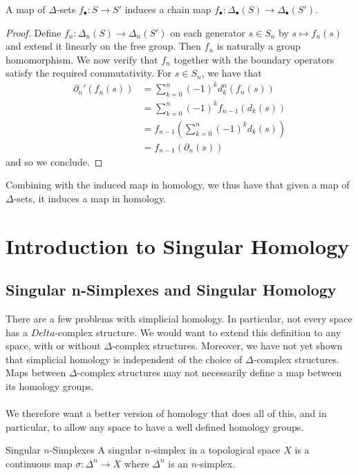 \documentclass[a4paper]{article}
\begin{document}
\begin{lmm}{}{} A map of $\Delta$-sets $f_\bullet:S\to S'$ induces a chain map $f_\bullet:\Delta_\bullet(S)\to\Delta_\bullet(S')$. \tcbline
\begin{proof}
Define $f_n:\Delta_n(S)\to\Delta_n(S')$ on each generator $s\in S_n$ by $s\mapsto f_n(s)$ and extend it linearly on the free group. Then $f_n$ is naturally a group homomorphism. We now verify that $f_n$ together with the boundary operators satisfy the required commutativity. For $s\in S_n$, we have that 
\begin{align*}
\partial_n'(f_n(s))&=\sum_{k=0}^n(-1)^kd_k^n(f_n(s))\\
&=\sum_{k=0}^n(-1)^kf_{n-1}(d_k(s))\\
&=f_{n-1}\left(\sum_{k=0}^n(-1)^kd_k(s)\right)\\
&=f_{n-1}(\partial_n(s))
\end{align*}
and so we conclude. 
\end{proof}
\end{lmm}

Combining with the induced map in homology, we thus have that given a map of $\Delta$-sets, it induces a map in homology. 

\pagebreak
\section{Introduction to Singular Homology}
\subsection{Singular n-Simplexes and Singular Homology}
There are a few problems with simplicial homology. In particular, not every space has a $Delta$-complex structure. We would want to extend this definition to any space, with or without $\Delta$-complex structures. Moreover, we have not yet shown that simplicial homology is independent of the choice of $\Delta$-complex structures. Maps between $\Delta$-complex structures may not necessarily define a map between its homology groups. \\~\\

We therefore want a better version of homology that does all of this, and in particular, to allow any space to have a well defined homology groups. 

\begin{defn}{Singular $n$-Simplexes}{} A singular $n$-simplex in a topological space $X$ is a continuous map $\sigma:\Delta^n\to X$ where $\Delta^n$ is an $n$-simplex. 
\end{defn}
\end{document}
